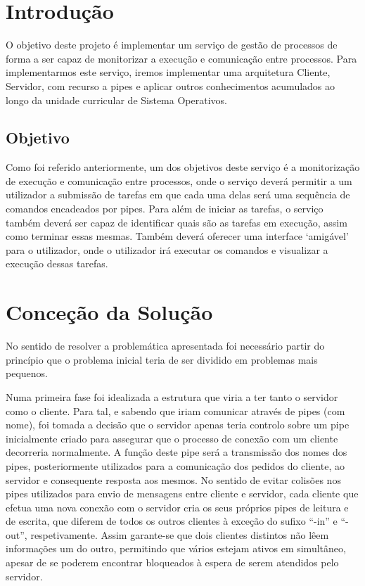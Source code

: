 \documentclass[a4paper]{article}
\begin{document}
\pagebreak

\tableofcontents

\pagebreak
\section{Introdução}
\label{sec:intro}

O objetivo deste projeto é implementar um serviço de gestão de processos de forma a ser capaz de monitorizar a execução e comunicação entre processos. Para implementarmos este serviço, iremos implementar uma arquitetura Cliente, Servidor, com recurso a pipes e aplicar outros conhecimentos acumulados ao longo da unidade curricular de Sistema Operativos. 



\subsection{Objetivo}
\label{sec:objetivo}

Como foi referido anteriormente, um dos objetivos deste serviço é a monitorização de execução e comunicação entre processos, onde o serviço deverá permitir a um utilizador a submissão de tarefas em que cada uma delas será uma sequência de comandos encadeados por pipes. 
Para além de iniciar as tarefas, o serviço também deverá ser capaz de identificar quais são as tarefas em execução, assim como terminar essas mesmas. 
Também deverá oferecer uma interface ‘amigável’ para o utilizador, onde o utilizador irá executar os comandos e visualizar a execução dessas tarefas.



\section{Conceção da Solução}
\label{sec:solução}
No sentido de resolver a problemática apresentada foi necessário partir do princípio que o problema inicial teria de ser dividido em problemas mais pequenos.\bigskip

Numa primeira fase foi idealizada a estrutura que viria a ter tanto o servidor como o cliente. Para tal, e sabendo que iriam comunicar através de pipes (com nome), foi tomada a decisão que o servidor apenas teria controlo sobre um pipe inicialmente criado para assegurar que o processo de conexão com um cliente decorreria normalmente. A função deste pipe será a transmissão dos nomes dos pipes, posteriormente utilizados para a comunicação dos pedidos do cliente, ao servidor e consequente resposta aos mesmos.
No sentido de evitar colisões nos pipes utilizados para envio de mensagens entre cliente e servidor, cada cliente que efetua uma nova conexão com o servidor cria os seus próprios pipes de leitura e de escrita, que diferem de todos os outros clientes à exceção do sufixo “-in” e “-out”, respetivamente. Assim garante-se que dois clientes distintos não lêem informações um do outro, permitindo que vários estejam ativos em simultâneo, apesar de se poderem encontrar bloqueados à espera de serem atendidos pelo servidor.\bigskip
\end{document}
